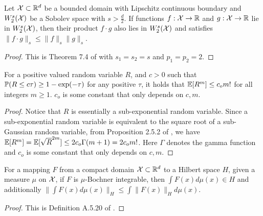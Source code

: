 \begin{lem}\label{lem:sobolev_algebra}
    Let $\mathcal{X} \subset \mathbb{R}^d$ be a bounded domain with Lipschitz continuous boundary and $W_2^s(\mathcal{X})$ be a Sobolev space with $s > \frac{d}{2}$. If functions $f:\mathcal{X} \to \mathbb{R}$ and $g:\mathcal{X} \to \mathbb{R}$ lie in $W_2^s(\mathcal{X})$, then their product $f \cdot g$ also lies in $W_2^s(\mathcal{X})$ and satisfies $\| f \cdot g \|_s \leq \| f \|_s \| g \|_s$.
\end{lem}
\begin{proof}
This is Theorem 7.4 of \citet{behzadan2021multiplication} with $s_1=s_2=s$ and $p_1=p_2=2$. 
\end{proof}
\begin{lem}\label{lem:prob_to_expectation}
For a positive valued random variable $R$, and $c > 0$ such that $\mathbb{P}(R \leq c \tau) \geq 1 - \exp(-\tau)$ for any positive $\tau$, it holds that $\operatorname{\mathbb{E}}[R^m] \leq c_o m! $ for all integers $m \geq 1$. $c_o$ is some constant that only depends on $c, m$.
\end{lem}
\begin{proof}
Notice that $R$ is essentially a sub-exponential random variable.
Since a sub-exponential random variable is equivalent to the square root of a sub-Gaussian random variable, from Proposition 2.5.2 of \citet{vershynin2018high}, we have $\operatorname{\mathbb{E}}[R^m] = \operatorname{\mathbb{E}}[\sqrt R ^{2m}] \leq 2 c_o \Gamma(m+1) = 2 c_o m!$.
Here $\Gamma$ denotes the gamma function and $c_o$ is some constant that only depends on $c, m$.
\end{proof}

\begin{lem}\label{lem:integral_in_hilbert}
    For a mapping $F$ from a compact domain $\mathcal{X} \subset \mathbb{R}^d$ to a Hilbert space $H$, given a measure $\mu$ on $\mathcal{X}$, if $F$ is $\mu$-Bochner integrable, then $\int F(x) d\mu(x) \in H$ and additionally $ \| \int F(x) d\mu(x)\|_H \leq \int \| F(x)\|_H d\mu(x)$.
\end{lem}
\begin{proof}
    This is Definition A.5.20 of \citet{steinwart2008support}.
\end{proof}

